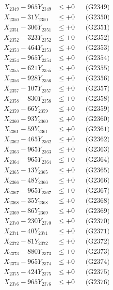 \documentclass[a4paper,10pt]{article}
\begin{document}
{\begin{align}
X_{2349} - 965Y_{2349} &\leq +0 && \text{(G2349)} \\
X_{2350} - 31Y_{2350} &\leq +0 && \text{(G2350)} \\
\allowbreak
X_{2351} - 306Y_{2351} &\leq +0 && \text{(G2351)} \\
X_{2352} - 323Y_{2352} &\leq +0 && \text{(G2352)} \\
X_{2353} - 464Y_{2353} &\leq +0 && \text{(G2353)} \\
X_{2354} - 965Y_{2354} &\leq +0 && \text{(G2354)} \\
X_{2355} - 621Y_{2355} &\leq +0 && \text{(G2355)} \\
X_{2356} - 928Y_{2356} &\leq +0 && \text{(G2356)} \\
X_{2357} - 107Y_{2357} &\leq +0 && \text{(G2357)} \\
X_{2358} - 830Y_{2358} &\leq +0 && \text{(G2358)} \\
X_{2359} - 66Y_{2359} &\leq +0 && \text{(G2359)} \\
X_{2360} - 93Y_{2360} &\leq +0 && \text{(G2360)} \\
\allowbreak
X_{2361} - 59Y_{2361} &\leq +0 && \text{(G2361)} \\
X_{2362} - 465Y_{2362} &\leq +0 && \text{(G2362)} \\
X_{2363} - 965Y_{2363} &\leq +0 && \text{(G2363)} \\
X_{2364} - 965Y_{2364} &\leq +0 && \text{(G2364)} \\
X_{2365} - 13Y_{2365} &\leq +0 && \text{(G2365)} \\
X_{2366} - 48Y_{2366} &\leq +0 && \text{(G2366)} \\
X_{2367} - 965Y_{2367} &\leq +0 && \text{(G2367)} \\
X_{2368} - 35Y_{2368} &\leq +0 && \text{(G2368)} \\
X_{2369} - 86Y_{2369} &\leq +0 && \text{(G2369)} \\
X_{2370} - 230Y_{2370} &\leq +0 && \text{(G2370)} \\
\allowbreak
X_{2371} - 40Y_{2371} &\leq +0 && \text{(G2371)} \\
X_{2372} - 81Y_{2372} &\leq +0 && \text{(G2372)} \\
X_{2373} - 880Y_{2373} &\leq +0 && \text{(G2373)} \\
X_{2374} - 965Y_{2374} &\leq +0 && \text{(G2374)} \\
X_{2375} - 424Y_{2375} &\leq +0 && \text{(G2375)} \\
X_{2376} - 965Y_{2376} &\leq +0 && \text{(G2376)} \\

\end{align}}
\end{document}

